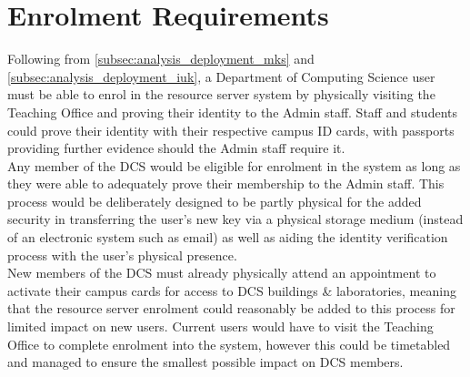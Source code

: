 \section{Enrolment Requirements}
\label{sec:analysis_enrolment}

Following from \cref{subsec:analysis_deployment_mks} and \cref{subsec:analysis_deployment_iuk}, a Department of Computing Science user must be able to enrol in the resource server system by physically visiting the Teaching Office and proving their identity to the Admin staff. Staff and students could prove their identity with their respective campus ID cards, with passports providing further evidence should the Admin staff require it.\\
Any member of the DCS would be eligible for enrolment in the system as long as they were able to adequately prove their membership to the Admin staff. This process would be deliberately designed to be partly physical for the added security in transferring the user's new key via a physical storage medium (instead of an electronic system such as email) as well as aiding the identity verification process with the user's physical presence.\\
New members of the DCS must already physically attend an appointment to activate their campus cards for access to DCS buildings \& laboratories, meaning that the resource server enrolment could reasonably be added to this process for limited impact on new users. Current users would have to visit the Teaching Office to complete enrolment into the system, however this could be timetabled and managed to ensure the smallest possible impact on DCS members.
